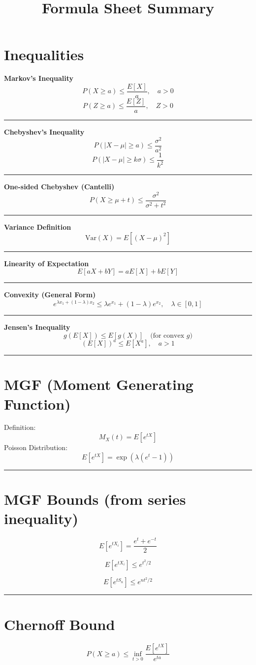 \documentclass[12pt]{article}
\title{Formula Sheet Summary}
\date{}
\begin{document}
\maketitle

\section*{Inequalities}

\textbf{Markov’s Inequality}
\[
P(X \ge a) \le \frac{E[X]}{a}, \quad a > 0
\]
\[
P(Z \ge a) \le \frac{E[Z]}{a}, \quad Z > 0
\]
\noindent\rule{\linewidth}{0.4pt}
\textbf{Chebyshev’s Inequality}
\[
P(|X - \mu| \ge a) \le \frac{\sigma^2}{a^2}
\]
\[
P(|X - \mu| \ge k\sigma) \le \frac{1}{k^2}
\]
\noindent\rule{\linewidth}{0.4pt}
\textbf{One-sided Chebyshev (Cantelli)}
\[
P(X \ge \mu + t) \le \frac{\sigma^2}{\sigma^2 + t^2}
\]
\noindent\rule{\linewidth}{0.4pt}

\textbf{Variance Definition}
\[
\mathrm{Var}(X) = E[(X - \mu)^2]
\]
\noindent\rule{\linewidth}{0.4pt}
\textbf{Linearity of Expectation}
\[
E[aX + bY] = aE[X] + bE[Y]
\]
\noindent\rule{\linewidth}{0.4pt}
\textbf{Convexity (General Form)}
\[
e^{\lambda x_1 + (1-\lambda)x_2} \le \lambda e^{x_1} + (1-\lambda)e^{x_2}, 
\quad \lambda \in [0,1]
\]
\noindent\rule{\linewidth}{0.4pt}
\textbf{Jensen’s Inequality}
\[
g(E[X]) \le E[g(X)] \quad \text{(for convex } g)
\]
\[
(E[X])^a \le E[X^a], \quad a > 1
\]
\noindent\rule{\linewidth}{0.4pt}
\section*{MGF (Moment Generating Function)}
Definition:
\[
M_X(t) = E[e^{tX}]
\]
Poisson Distribution:
\[
E[e^{tX}] = \exp\left(\lambda (e^t - 1)\right)
\]
\noindent\rule{\linewidth}{0.4pt}
\section*{MGF Bounds (from series inequality)}

\[
E\left[e^{tX_i}\right] = \frac{e^t + e^{-t}}{2}
\]

\[
E\left[e^{tX_i}\right] \le e^{t^2/2}
\]

\[
E\left[e^{tS_n}\right] \le e^{nt^2/2}
\]
\noindent\rule{\linewidth}{0.4pt}
\section*{Chernoff Bound}

\[
P(X \ge a) \le \inf_{t>0} \frac{E[e^{tX}]}{e^{ta}}
\]
\end{document}
